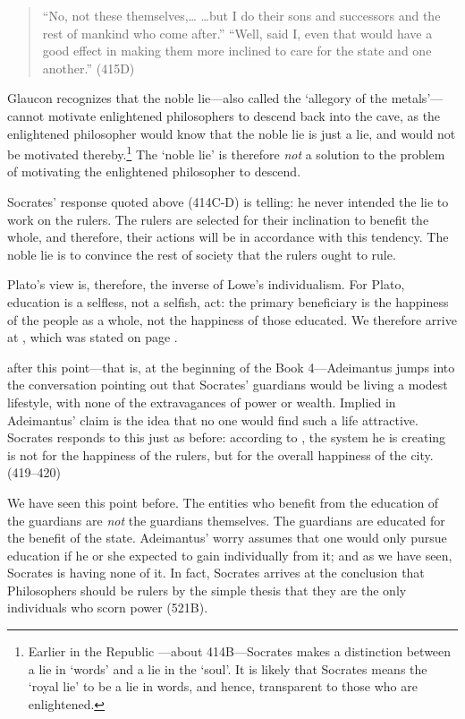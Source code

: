\begin{quote}

``No, not these themselves,{\ldots} {\ldots}but I do their sons and successors and the rest of mankind who come after.''
``Well, said I, even that would have a good effect in making them more inclined to care for the state and one another.'' (415D)
\end{quote}

Glaucon recognizes that the noble lie---also called the `allegory of the metals'---cannot motivate enlightened philosophers to descend back into the cave, as the enlightened philosopher would know that the noble lie is just a lie, and would not be motivated thereby.\footnote{Earlier in the Republic ---about 414B---Socrates makes a distinction between a lie in `words' and a lie in the `soul'. It is likely that Socrates means the `royal lie' to be a lie in words, and hence, transparent to those who are enlightened.} The `noble lie' is therefore \emph{not} a solution to the problem of motivating the enlightened philosopher to descend.

Socrates' response quoted above (414C-D) is telling: he never intended the lie to work on the rulers. The rulers are selected for their inclination to benefit the whole, and therefore, their actions will be in accordance with this tendency. The noble lie is to convince the rest of society that the rulers ought to rule.

Plato's view is, therefore, the inverse of Lowe's individualism. For Plato, education is a selfless, not a selfish, act: the primary beneficiary is the happiness of the people as a whole, not the happiness of those educated. We therefore arrive at , which was stated on page \pageref{platoobjects}.

 after this point---that is, at the beginning of the Book 4---Adeimantus jumps into the conversation pointing out that Socrates' guardians would be living a modest lifestyle, with none of the extravagances of power or wealth. Implied in Adeimantus' claim is the idea that no one would find such a life attractive. Socrates responds to this just as before: according to , the system he is creating is not for the happiness of the rulers, but for the overall happiness of the city. (419--420)

We have seen this point before. The entities who benefit from the education of the guardians are \emph{not} the guardians themselves. The guardians are educated for the benefit of the state. Adeimantus' worry assumes that one would only pursue education if he or she expected to gain individually from it; and as we have seen, Socrates is having none of it. In fact, Socrates arrives at the conclusion that Philosophers should be rulers by the simple thesis that they are the only individuals who scorn power (521B).

